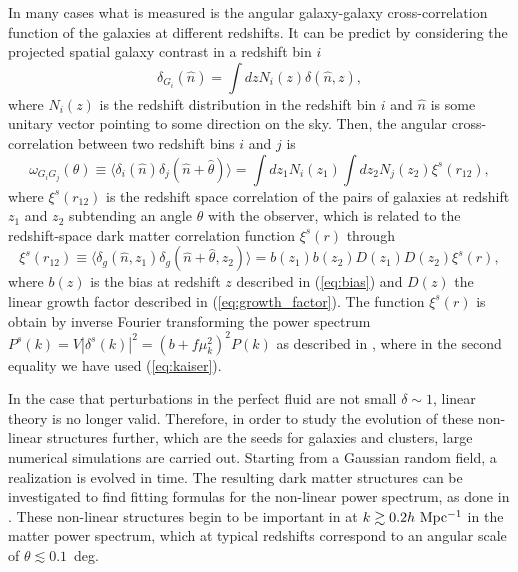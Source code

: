 In many cases what is measured is the angular galaxy-galaxy cross-correlation function of the galaxies at different redshifts. It can be predict by considering the projected spatial galaxy contrast in a redshift bin $i$
\begin{equation}
\delta_{G_i}(\hat{n}) = \int dz N_i(z) \delta (\hat{n}, z),
\end{equation}
where $N_i(z)$ is the redshift distribution in the redshift bin $i$ and $\hat{n}$ is some unitary vector pointing to some direction on the sky. Then, the angular cross-correlation between two redshift bins $i$ and $j$ is
\begin{equation}
\omega_{G_iG_j} (\theta) \equiv \langle \delta_i (\hat{n}) \delta_j(\hat{n}+\hat{\theta}) \rangle = \int dz_1 N_i(z_1) \int dz_2 N_j(z_2) \xi^s(r_{12}),
\label{eq:corr_prediction}
\end{equation}
where $\xi^s(r_{12})$ is the redshift space correlation of the pairs of galaxies at redshift $z_1$ and $z_2$ subtending an angle $\theta$ with the observer, which is related to the redshift-space dark matter correlation function $\xi^s(r)$ through 
\begin{equation}
\xi^s(r_{12}) \equiv \langle \delta_g (\hat{n},z_1) \delta_g(\hat{n}+\hat{\theta},z_2) \rangle=b(z_1)b(z_2)D(z_1)D(z_2) \xi^s(r),
\end{equation}
where $b(z)$ is the bias at redshift $z$ described in (\ref{eq:bias}) and $D(z)$ the linear growth factor described in (\ref{eq:growth_factor}). The function $\xi^s(r)$ is obtain by inverse Fourier transforming the power spectrum $P^s(k)=V|\delta^s(k)|^2=(b+f\mu_k^2)^2P(k)$ as described in \citet{Hamilton1992}, where in the second equality we have used (\ref{eq:kaiser}).

In the case that perturbations in the perfect fluid are not small $\delta \sim 1$, linear theory is no longer valid. Therefore, in order to study the evolution of these non-linear structures further, which are the seeds for galaxies and clusters, large numerical simulations are carried out. Starting from a Gaussian random field, a realization is evolved in time. The resulting dark matter structures can be investigated to find fitting formulas for the non-linear power spectrum, as done in \citet{Smith2003}. These non-linear structures begin to be important in at $k\gtrsim0.2h\ \rm Mpc^{-1}$ in the matter power spectrum, which at typical redshifts correspond to an angular scale of $\theta \lesssim 0.1$~deg.

